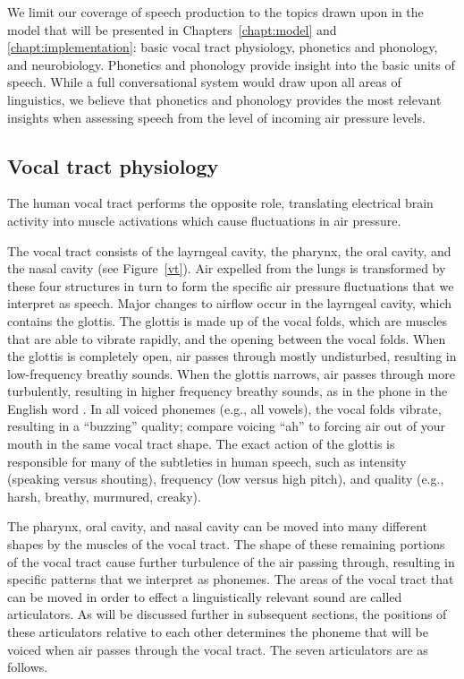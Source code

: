 We limit our coverage
of speech production
to the topics drawn upon
in the model that will be presented
in Chapters~\ref{chapt:model}
and \ref{chapt:implementation}:
basic vocal tract physiology,
phonetics and phonology,
and neurobiology.
Phonetics and phonology
provide insight into the basic units of speech.
While a full conversational system
would draw upon all areas of linguistics,
we believe that phonetics and phonology
provides the most relevant insights
when assessing speech from the level of
incoming air pressure levels.

\subsection{Vocal tract physiology}

The human vocal tract performs
the opposite role,
translating electrical brain activity
into muscle activations
which cause fluctuations in air pressure.


The vocal tract consists of
the layrngeal cavity,
the pharynx, the oral cavity,
and the nasal cavity
(see Figure~\ref{vt}).
Air expelled from the lungs
is transformed
by these four structures
in turn to form the
specific air pressure fluctuations
that we interpret as speech.
Major changes to airflow
occur in the layrngeal cavity,
which contains the glottis.
The glottis is made up of
the vocal folds,
which are muscles that are able to vibrate rapidly,
and the opening between the vocal folds.
When the glottis is completely open,
air passes through mostly undisturbed,
resulting in low-frequency breathy sounds.
When the glottis narrows,
air passes through more turbulently,
resulting in higher frequency breathy sounds,
as in the phone \ipa{[h]}
in the English word .
In all voiced phonemes (e.g., all vowels),
the vocal folds vibrate,
resulting in a ``buzzing'' quality;
compare voicing ``ah'' to
forcing air out of your mouth
in the same vocal tract shape.
The exact action of the glottis
is responsible for many
of the subtleties in human speech,
such as intensity (speaking versus shouting),
frequency (low versus high pitch),
and quality (e.g., harsh, breathy, murmured, creaky).

The pharynx, oral cavity, and nasal cavity
can be moved into many different shapes
by the muscles of the vocal tract.
The shape of these remaining portions
of the vocal tract cause further turbulence
of the air passing through,
resulting in specific patterns
that we interpret as phonemes.
The areas of the vocal tract
that can be moved in order to
effect a linguistically relevant sound
are called articulators.
As will be discussed further
in subsequent sections,
the positions of these articulators
relative to each other
determines the phoneme
that will be voiced
when air passes through
the vocal tract.
The seven articulators are
as follows.

